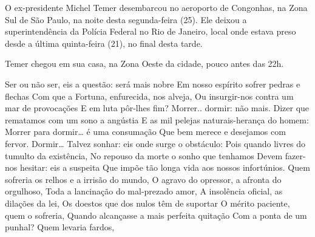 \label{secintro}

O ex-presidente Michel Temer desembarcou no aeroporto de Congonhas, na Zona Sul de São Paulo, na noite desta segunda-feira (25). Ele deixou a superintendência da Polícia Federal no Rio de Janeiro, local onde estava preso desde a última quinta-feira (21), no final desta tarde.

Temer chegou em sua casa, na Zona Oeste da cidade, pouco antes das 22h.

Ser ou não ser, eis a questão: será mais nobre
Em nosso espírito sofrer pedras e flechas
Com que a Fortuna, enfurecida, nos alveja,
Ou insurgir-nos contra um mar de provocações
E em luta pôr-lhes fim? Morrer.. dormir: não mais.
Dizer que rematamos com um sono a angústia
E as mil pelejas naturais-herança do homem:
Morrer para dormir… é uma consumação
Que bem merece e desejamos com fervor.
Dormir… Talvez sonhar: eis onde surge o obstáculo:
Pois quando livres do tumulto da existência,
No repouso da morte o sonho que tenhamos
Devem fazer-nos hesitar: eis a suspeita
Que impõe tão longa vida aos nossos infortúnios.
Quem sofreria os relhos e a irrisão do mundo,
O agravo do opressor, a afronta do orgulhoso,
Toda a lancinação do mal-prezado amor,
A insolência oficial, as dilações da lei,
Os doestos que dos nulos têm de suportar
O mérito paciente, quem o sofreria,
Quando alcançasse a mais perfeita quitação
Com a ponta de um punhal? Quem levaria fardos,






